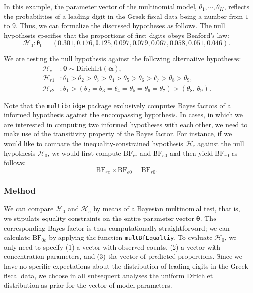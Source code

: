\documentclass[
  english,
  man,floatsintext]{apa6}
\begin{document}
In this example, the parameter vector of the multinomial model, \(\theta_1, \cdots, \theta_K\), reflects the probabilities of a leading digit in the Greek fiscal data being a number from \(1\) to \(9\). Thus, we can formalize the discussed hypotheses as follows. The null hypothesis specifies that the proportions of first digits obeys Benford's law:
\[\mathcal{H}_0 : \boldsymbol{\theta}_0 = (0.301, 0.176, 0.125, 0.097, 0.079, 0.067, 0.058, 0.051, 0.046).\]

We are testing the null hypothesis against the following alternative hypotheses:
\begin{align*}
\mathcal{H}_e &: \boldsymbol{\theta} \sim \text{Dirichlet}(\boldsymbol{\alpha}), \\
\mathcal{H}_{r1} &: \theta_1 > \theta_2 > \theta_3 > \theta_4 > \theta_5 > \theta_6 > \theta_7 > \theta_8 > \theta_9, \\
\mathcal{H}_{r2} &:  \theta_1 > (\theta_2 = \theta_3 = \theta_4 = \theta_5 = \theta_6 = \theta_7) > (\theta_8, \ \theta_9).
\end{align*}

Note that the \texttt{multibridge} package exclusively computes Bayes factors of a informed hypothesis against the encompassing hypothesis. In cases, in which we are interested in computing two informed hypotheses with each other, we need to make use of the transitivity property of the Bayes factor. For instance, if we would like to compare the inequality-constrained hypothesis \(\mathcal{H}_r\) against the null hypothesis \(\mathcal{H}_0\), we would first compute \(\text{BF}_{er}\) and \(\text{BF}_{e0}\) and then yield \(\text{BF}_{r0}\) as follows:
\[\text{BF}_{re} \times \text{BF}_{e0} = \text{BF}_{r0}.\]

\hypertarget{method}{%
\subsubsection{Method}\label{method}}

We can compare \(\mathcal{H}_0\) and \(\mathcal{H}_e\) by means of a Bayesian multinomial test, that is, we stipulate equality constraints on the entire parameter vector \(\boldsymbol{\theta}\). The corresponding Bayes factor is thus computationally straightforward; we can calculate \(\text{BF}_{0e}\) by applying the function \texttt{multBfEqualtiy}. To evaluate \(\mathcal{H}_0\), we only need to specify (1) a vector with observed counts, (2) a vector with concentration parameters, and (3) the vector of predicted proportions. Since we have no specific expectations about the distribution of leading digits in the Greek fiscal data, we choose in all subsequent analyses the uniform Dirichlet distribution as prior for the vector of model parameters.
\end{document}
